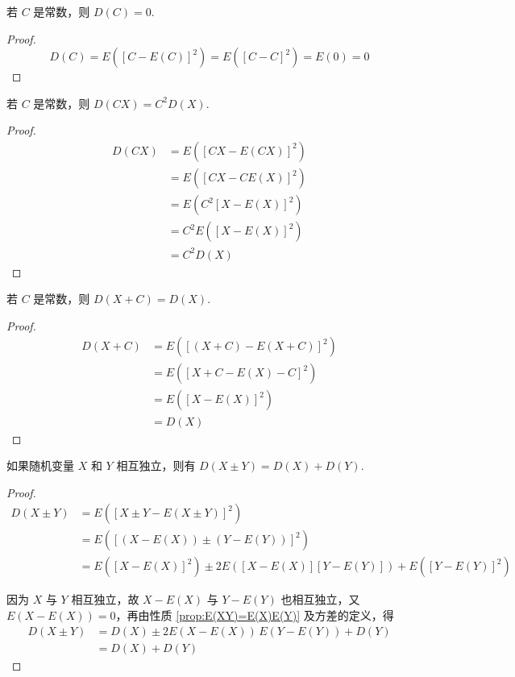 \begin{property}
    \indent 若 $C$ 是常数，则 $D(C) = 0$.
\end{property}

\begin{proof}
    $$
    D(C) = E([C-E(C)]^2) = E([C-C]^2) = E(0) = 0
    $$
\end{proof}

\begin{property}
    \indent 若 $C$ 是常数，则 $D(CX) = C^2 D(X)$.
\end{property}

\begin{proof}
    $$
    \begin{aligned}
        D(CX) &= E([CX - E(CX)]^2) \\
        &= E([CX - CE(X)]^2) \\
        &= E(C^2 [X-E(X)]^2) \\
        &= C^2 E([X-E(X)]^2) \\
        &= C^2 D(X)
    \end{aligned}
    $$
\end{proof}

\begin{property}
    \indent 若 $C$ 是常数，则 $D(X+C) = D(X)$.
\end{property}

\begin{proof}
    $$
    \begin{aligned}
        D(X+C) &= E([(X+C) - E(X+C)]^2) \\
        &= E([X + C - E(X) - C]^2) \\
        &= E([X-E(X)]^2) \\
        &= D(X)
    \end{aligned}
    $$
\end{proof}

\begin{property}[][][prop:D(X+Y)=D(X)+D(Y)]
    \indent 如果随机变量 $X$ 和 $Y$ 相互独立，则有 $D(X \pm Y) = D(X)+D(Y)$.
\end{property}

\begin{proof}
    $$
    \begin{aligned}
        D(X \pm Y) &= E([X \pm Y - E(X \pm Y)]^2) \\
        &= E([(X-E(X)) \pm (Y-E(Y))]^2) \\
        &= E([X-E(X)]^2) \pm 2E([X-E(X)][Y-E(Y)]) + E([Y-E(Y)]^2)
    \end{aligned}
    $$

    因为 $X$ 与 $Y$ 相互独立，故 $X-E(X)$ 与 $Y-E(Y)$ 也相互独立，又 $E(X-E(X)) = 0$，再由性质 \ref{prop:E(XY)=E(X)E(Y)} 及方差的定义，得
    $$
    \begin{aligned}
        D(X \pm Y) &= D(X) \pm 2E(X-E(X)) \, E(Y-E(Y)) + D(Y) \\
        &= D(X) + D(Y)
    \end{aligned}
    $$
\end{proof}


